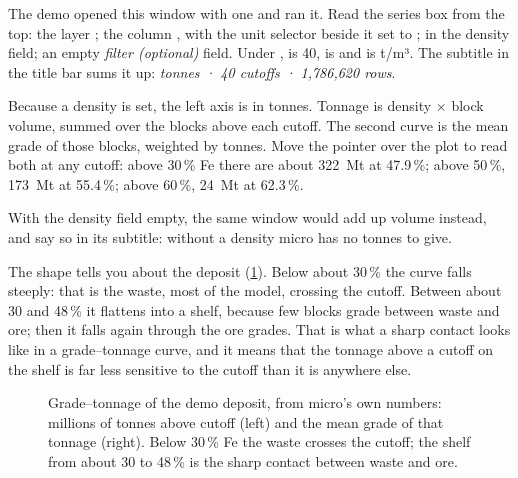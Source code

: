 The demo opened this window with one  and ran it. Read the series box from the top: the layer ; the column , with the unit selector beside it set to \ui{\%};  in the density field; an empty \emph{filter (optional)} field. Under ,  is 40,  is \ui{\%} and  is t/m³. The subtitle in the title bar sums it up: \emph{tonnes · 40 cutoffs · 1,786,620 rows}.

Because a density is set, the left axis is in tonnes. Tonnage is density × block volume, summed over the blocks above each cutoff. The second curve is the mean grade of those blocks, weighted by tonnes. Move the pointer over the plot to read both at any cutoff: above 30\,\% Fe there are about 322~Mt at 47.9\,\%; above 50\,\%, 173~Mt at 55.4\,\%; above 60\,\%, 24~Mt at 62.3\,\%.

With the density field empty, the same window would add up volume instead, and say so in its subtitle: without a density micro has no tonnes to give.

The shape tells you about the deposit (\cref{fig:tour-gt}). Below about 30\,\% the curve falls steeply: that is the waste, most of the model, crossing the cutoff. Between about 30 and 48\,\% it flattens into a shelf, because few blocks grade between waste and ore; then it falls again through the ore grades. That is what a sharp contact looks like in a grade–tonnage curve, and it means that the tonnage above a cutoff on the shelf is far less sensitive to the cutoff than it is anywhere else.

\begin{figure}[htbp]\centering
{}\hfill
{}
\caption{Grade–tonnage of the demo deposit, from micro's own numbers: millions of tonnes above cutoff (left) and the mean grade of that tonnage (right). Below 30\,\% Fe the waste crosses the cutoff; the shelf from about 30 to 48\,\% is the sharp contact between waste and ore.}\label{fig:tour-gt}
\end{figure}

